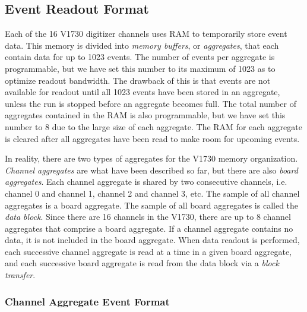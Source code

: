 \subsection{Event Readout Format} \label{subsec:memory}

Each of the 16 V1730 digitizer channels uses RAM to temporarily store event data. This memory is divided into \emph{memory buffers}, or \emph{aggregates}, that each contain data for up to 1023 events. The number of events per aggregate is programmable, but we have set this number to its maximum of 1023 as to optimize readout bandwidth. The drawback of this is that events are not available for readout until all 1023 events have been stored in an aggregate, unless the run is stopped before an aggregate becomes full. The total number of aggregates contained in the RAM is also programmable, but we have set this number to 8 due to the large size of each aggregate. The RAM for each aggregate is cleared after all aggregates have been read to make room for upcoming events. %

In reality, there are two types of aggregates for the V1730 memory organization. \emph{Channel aggregates} are what have been described so far, but there are also \emph{board aggregates}. Each channel aggregate is shared by two consecutive channels, i.e. channel 0 and channel 1, channel 2 and channel 3, etc. The sample of all channel aggregates is a board aggregate. The sample of all board aggregates is called the \emph{data block}. Since there are 16 channels in the V1730, there are up to 8 channel aggregates that comprise a board aggregate. If a channel aggregate contains no data, it is not included in the board aggregate. When data readout is performed, each successive channel aggregate is read at a time in a given board aggregate, and each successive board aggregate is read from the data block via a \emph{block transfer}.

\subsubsection{Channel Aggregate Event Format} %

